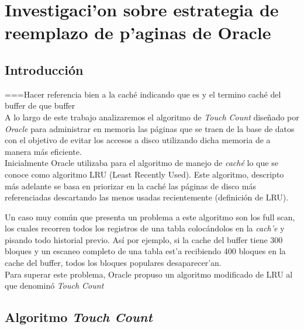 \documentclass[11pt, a4paper, spanish]{article}
\newenvironment{borde}[1]
{\begin{lrbox}{\fmbox}\begin{minipage}{#1}}
{\end{minipage}\end{lrbox}\fbox{\usebox{\fmbox}}\\[10pt]}
\begin{document}


\newpage 
\section{Investigaci'on sobre estrategia de reemplazo de p'aginas de Oracle}

\subsection{Introducci\'on}

===Hacer referencia bien a la caché indicando que es y el termino caché del buffer de que buffer\\

A lo largo de este trabajo analizaremos el algoritmo de \textit{Touch Count} dise\~{n}ado por \textit{Oracle} para administrar en memoria las p\'aginas que se
traen de la base de datos con el objetivo de evitar los accesos a disco utilizando dicha memoria de a manera m\'as eficiente.\\

Inicialmente Oracle utilizaba para el algoritmo de manejo de \textit{cach\'e} lo que se conoce como algoritmo LRU (Least Recently Used). Este algoritmo, 
descripto m\'as adelante se basa en priorizar en la cach\'e las p\'aginas de disco más referenciadas descartando las menos usadas recientemente 
(definici\'on de LRU).

Un caso muy com\'un que presenta un problema a este algoritmo son los full scan, los cuales recorren todos los registros de una tabla coloc\'andolos en 
la \textit{cach'e} y pisando todo historial previo. As\'i por ejemplo, si la cache del buffer tiene 300 bloques y un escaneo completo de una 
tabla est'a recibiendo 400 bloques en la cache del buffer, todos los bloques populares desaparecer'an. \\

Para superar este problema, Oracle propuso un algoritmo modificado de LRU al que denomin\'o \textit{Touch Count}
  
\subsection{Algoritmo \textit{Touch Count}}
\end{document}
